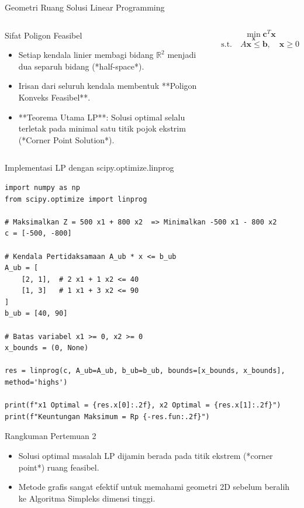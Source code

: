 \documentclass[10pt,aspectratio=169]{beamer}
\newcommand{\R}{\mathbb{R}}
\begin{document}
\begin{frame}{Geometri Ruang Solusi Linear Programming}
    \begin{columns}
        \begin{block}{Sifat Poligon Feasibel}
            \begin{itemize}
                \item Setiap kendala linier membagi bidang $\R^2$ menjadi dua separuh bidang (*half-space*).
                \item Irisan dari seluruh kendala membentuk **Poligon Konveks Feasibel**.
                \item **Teorema Utama LP**: Solusi optimal selalu terletak pada minimal satu titik pojok ekstrim (*Corner Point Solution*).
            \end{itemize}
        \end{block}

        \begin{tcolorbox}[colback=unibgold!10,colframe=unibgold!80!black,title=\textbf{Formulasi Standar LP}]
            \[
                \min_{\mathbf{x}} \mathbf{c}^T \mathbf{x}
            \]
            \[
                \text{s.t.} \quad A \mathbf{x} \le \mathbf{b}, \quad \mathbf{x} \ge 0
            \]
        \end{tcolorbox}
    \end{columns}
\end{frame}

\begin{frame}[fragile]{Implementasi LP dengan scipy.optimize.linprog}
\begin{lstlisting}
import numpy as np
from scipy.optimize import linprog

# Maksimalkan Z = 500 x1 + 800 x2  => Minimalkan -500 x1 - 800 x2
c = [-500, -800]

# Kendala Pertidaksamaan A_ub * x <= b_ub
A_ub = [
    [2, 1],  # 2 x1 + 1 x2 <= 40
    [1, 3]   # 1 x1 + 3 x2 <= 90
]
b_ub = [40, 90]

# Batas variabel x1 >= 0, x2 >= 0
x_bounds = (0, None)

res = linprog(c, A_ub=A_ub, b_ub=b_ub, bounds=[x_bounds, x_bounds], method='highs')

print(f"x1 Optimal = {res.x[0]:.2f}, x2 Optimal = {res.x[1]:.2f}")
print(f"Keuntungan Maksimum = Rp {-res.fun:.2f}")
\end{lstlisting}
\end{frame}

\begin{frame}{Rangkuman Pertemuan 2}
    \begin{tcolorbox}[colback=unibblue!10,colframe=unibblue,title=\textbf{Poin Kunci}]
        \begin{itemize}
            \item Solusi optimal masalah LP dijamin berada pada titik ekstrem (*corner point*) ruang feasibel.
            \item Metode grafis sangat efektif untuk memahami geometri 2D sebelum beralih ke Algoritma Simpleks dimensi tinggi.
        \end{itemize}
    \end{tcolorbox}
\end{frame}
\end{document}
